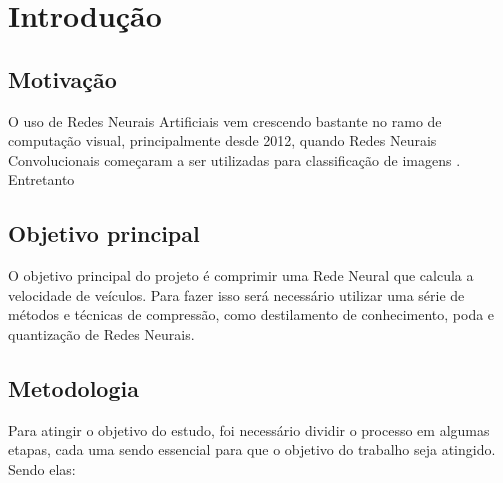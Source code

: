 \chapter{Introdução}

\section{Motivação}
O uso de Redes Neurais Artificiais vem crescendo bastante no ramo de computação visual, principalmente
desde 2012, quando Redes Neurais Convolucionais começaram a ser utilizadas para classificação de imagens
\cite{alexnet}. Entretanto


\section{Objetivo principal}
O objetivo principal do projeto é comprimir uma Rede Neural que calcula a velocidade de veículos. Para fazer isso será
necessário utilizar uma série de métodos e técnicas de compressão, como destilamento de conhecimento, poda e quantização de Redes Neurais.

\section{Metodologia}
Para atingir o objetivo do estudo, foi necessário dividir o processo em algumas etapas, cada uma sendo
essencial para que o objetivo do trabalho seja atingido. Sendo elas:

